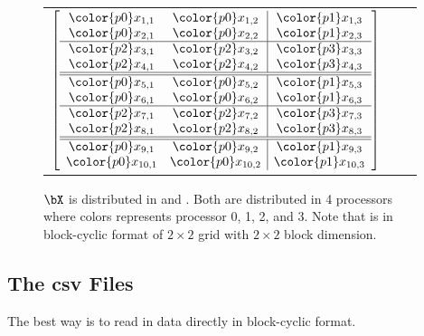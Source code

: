 \begin{figure}
\begin{center}
\begin{tabular}{ccc}
$
\left[
\begin{array}{cc|c}
\color{p0}x_{1,1} & \color{p0}x_{1,2} & \color{p1}x_{1,3} \\
\color{p0}x_{2,1} & \color{p0}x_{2,2} & \color{p1}x_{2,3} \\ \hline
\color{p2}x_{3,1} & \color{p2}x_{3,2} & \color{p3}x_{3,3} \\
\color{p2}x_{4,1} & \color{p2}x_{4,2} & \color{p3}x_{4,3} \\ \hline \hline
\color{p0}x_{5,1} & \color{p0}x_{5,2} & \color{p1}x_{5,3} \\
\color{p0}x_{6,1} & \color{p0}x_{6,2} & \color{p1}x_{6,3} \\ \hline
\color{p2}x_{7,1} & \color{p2}x_{7,2} & \color{p3}x_{7,3} \\
\color{p2}x_{8,1} & \color{p2}x_{8,2} & \color{p3}x_{8,3} \\ \hline \hline
\color{p0}x_{9,1} & \color{p0}x_{9,2} & \color{p1}x_{9,3} \\
\color{p0}x_{10,1} & \color{p0}x_{10,2} & \color{p1}x_{10,3} \\
\end{array}
\right]
$
\end{tabular}
\end{center}
\caption{
$\bX$ is distributed in
 and .
Both are distributed in 4 processors
where colors represents processor {\color{p0}0},
{\color{p1}1}, {\color{p2}2}, and {\color{p3}3}.
Note that  is in block-cyclic format of
$2\times 2$ grid with $2\times 2$ block dimension.
}
\end{figure}




\subsection[The csv Files]{The csv Files}
\label{sec:csv_files}

The best way is to read in data directly in block-cyclic format.
